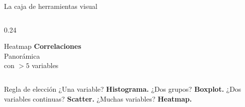 \documentclass[aspectratio=169,10pt]{beamer}
\begin{document}
\begin{frame}{La caja de herramientas visual}
\begin{columns}[T]
\begin{column}{0.24\textwidth}
\begin{block}{\centering Heatmap}
        \centering\scriptsize\vspace{1mm}
        \textbf{Correlaciones}\\[2mm]
        Panorámica\\con $>5$ variables
        \vspace{1mm}
      \end{block}
    \end{column}
  \end{columns}
  \vspace{0.5mm}
  \begin{exampleblock}{\centering Regla de elección}
    \centering\scriptsize
    ¿Una variable? \textbf{Histograma.}\quad
    ¿Dos grupos? \textbf{Boxplot.}\quad
    ¿Dos variables continuas? \textbf{Scatter.}\quad
    ¿Muchas variables? \textbf{Heatmap.}
  \end{exampleblock}
\end{frame}
\end{document}
